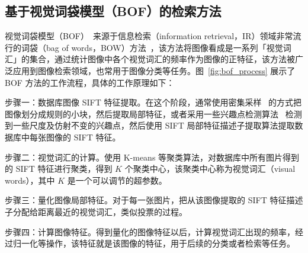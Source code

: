 \subsection{基于视觉词袋模型（BOF）的检索方法}
视觉词袋模型（BOF）~\cite{OHara2011IntroductionTT,Nowak2006SamplingSF,Yang2007EvaluatingBR}来源于信息检索（information retrieval，IR）领域非常流行的词袋（bag of words，BOW）方法~\cite{manning2008introduction,Salton1975AVS}，该方法将图像看成是一系列「视觉词汇」的集合，通过统计图像中各个视觉词汇的频率作为图像的正特征，该方法被广泛应用到图像检索领域，也常用于图像分类等任务。图~\ref{fig:bof_process} 展示了 BOF 方法的工作流程，具体的工作原理如下：

步骤一：数据库图像 SIFT 特征提取。在这个阶段，通常使用密集采样~\cite{Vogel2004NaturalSR,FeiFei2005ABH} 的方式把图像划分成规则的小块，然后提取局部特征，或者采用一些兴趣点检测算法~\cite{Mikolajczyk2004ScaleA} 检测到一些尺度及仿射不变的兴趣点，然后使用 SIFT 局部特征描述子提取算法提取数据库中每张图像的 SIFT 特征。

步骤二：视觉词汇的计算。使用 K-means 等聚类算法，对数据库中所有图片得到的 SIFT 特征进行聚类，得到 $K$ 个聚类中心，该聚类中心称为视觉词汇（visual words），其中 $K$ 是一个可以调节的超参数。

步骤三：量化图像局部特征。对于每一张图片，把从该图像提取的 SIFT 特征描述子分配给距离最近的视觉词汇，类似投票的过程。

步骤四：计算图像特征。得到量化的图像特征以后，计算视觉词汇出现的频率，经过归一化等操作，该特征就是该图像的特征，用于后续的分类或者检索等任务。

